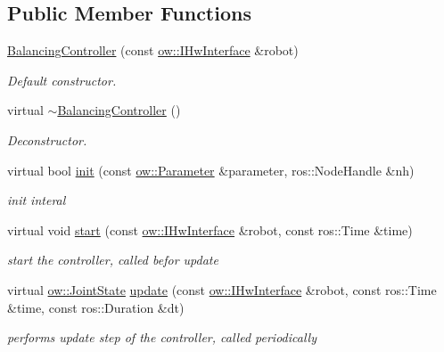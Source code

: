 \subsection*{Public Member Functions}
\begin{DoxyCompactItemize}
\item 
\hyperlink{classow__controller_1_1BalancingController_a9b5602a2c2bbc059051d9c6d35e99d87}{Balancing\+Controller} (const \hyperlink{classow_1_1IHwInterface}{ow\+::\+I\+Hw\+Interface} \&robot)
\begin{DoxyCompactList}\small\item\em Default constructor. \end{DoxyCompactList}\item 
virtual \hyperlink{classow__controller_1_1BalancingController_a5ebe27ea23ed957c7e68faad41f01e50}{$\sim$\+Balancing\+Controller} ()\hypertarget{classow__controller_1_1BalancingController_a5ebe27ea23ed957c7e68faad41f01e50}{}\label{classow__controller_1_1BalancingController_a5ebe27ea23ed957c7e68faad41f01e50}

\begin{DoxyCompactList}\small\item\em Deconstructor. \end{DoxyCompactList}\item 
virtual bool \hyperlink{classow__controller_1_1BalancingController_a1b06a2454dd0ce27675390af723d2029}{init} (const \hyperlink{classow_1_1Parameter}{ow\+::\+Parameter} \&parameter, ros\+::\+Node\+Handle \&nh)
\begin{DoxyCompactList}\small\item\em init interal \end{DoxyCompactList}\item 
virtual void \hyperlink{classow__controller_1_1BalancingController_a061c4b831294f654a4582bd19a922967}{start} (const \hyperlink{classow_1_1IHwInterface}{ow\+::\+I\+Hw\+Interface} \&robot, const ros\+::\+Time \&time)
\begin{DoxyCompactList}\small\item\em start the controller, called befor update \end{DoxyCompactList}\item 
virtual \hyperlink{classow__core_1_1JointState}{ow\+::\+Joint\+State} \hyperlink{classow__controller_1_1BalancingController_ae68ceb16f4350e701168b0e3e43f87ed}{update} (const \hyperlink{classow_1_1IHwInterface}{ow\+::\+I\+Hw\+Interface} \&robot, const ros\+::\+Time \&time, const ros\+::\+Duration \&dt)
\begin{DoxyCompactList}\small\item\em performs update step of the controller, called periodically \end{DoxyCompactList}\end{DoxyCompactItemize}
